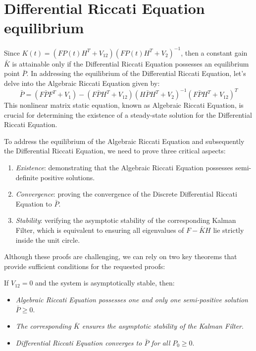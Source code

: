 \section{Differential Riccati Equation equilibrium}

Since $K(t)=\left(FP(t)H^T+V_{12}\right)\left(FP(t)H^T+V_2\right)^{-1}$, then a constant gain $\bar{K}$ is attainable only if the Differential Riccati Equation possesses an equilibrium point $\bar{P}$.
In addressing the equilibrium of the Differential Riccati Equation, let's delve into the Algebraic Riccati Equation given by:
\[\bar{P}=\left(F\bar{P}F^T+V_1\right)-\left(F\bar{P}H^T+V_{12}\right)\left(H\bar{P}H^T+V_{2}\right)^{-1}\left(F\bar{P}H^T+V_{12}\right)^T\]
This nonlinear matrix static equation, known as Algebraic Riccati Equation, is crucial for determining the existence of a steady-state solution for the Differential Riccati Equation.

To address the equilibrium of the Algebraic Riccati Equation and subsequently the Differential Riccati Equation, we need to prove three critical aspects:
\begin{enumerate}
    \item \textit{Existence}: demonstrating that the Algebraic Riccati Equation possesses semi-definite positive solutions.
    \item \textit{Convergence}: proving the convergence of the Discrete Differential Riccati Equation to $\bar{P}$.
    \item \textit{Stability}: verifying the asymptotic stability of the corresponding Kalman Filter, which is equivalent to ensuring all eigenvalues of $F-\bar{K}H$ lie strictly inside the unit circle.
\end{enumerate}
Although these proofs are challenging, we can rely on two key theorems that provide sufficient conditions for the requested proofs:
\begin{theorem}
    If $V_{12}=0$ and the system is asymptotically stable, then:
\end{theorem}  
\begin{itemize}
    \item \textit{Algebraic Riccati Equation possesses one and only one semi-positive solution $\bar{P}\geq 0$}.
    \item \textit{The corresponding $\bar{K}$ ensures the asymptotic stability of the Kalman Filter}. 
    \item \textit{Differential Riccati Equation converges to $\bar{P}$ for all $P_0\geq 0$}.
\end{itemize}

